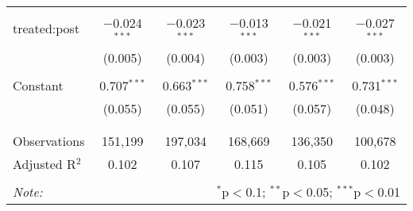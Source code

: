 \begin{table}[!htbp]
\begin{tabular}{@{\extracolsep{0pt}}lccccc}
  & & & & & \\ 
 treated:post & $-$0.024$^{***}$ & $-$0.023$^{***}$ & $-$0.013$^{***}$ & $-$0.021$^{***}$ & $-$0.027$^{***}$ \\ 
  & (0.005) & (0.004) & (0.003) & (0.003) & (0.003) \\ 
  & & & & & \\ 
 Constant & 0.707$^{***}$ & 0.663$^{***}$ & 0.758$^{***}$ & 0.576$^{***}$ & 0.731$^{***}$ \\ 
  & (0.055) & (0.055) & (0.051) & (0.057) & (0.048) \\ 
  & & & & & \\ 
\hline \\[-1.8ex] 
Observations & 151,199 & 197,034 & 168,669 & 136,350 & 100,678 \\ 
Adjusted R$^{2}$ & 0.102 & 0.107 & 0.115 & 0.105 & 0.102 \\ 
\hline 
\hline \\[-1.8ex] 
\textit{Note:}  & \multicolumn{5}{r}{$^{*}$p$<$0.1; $^{**}$p$<$0.05; $^{***}$p$<$0.01} \\ 
\end{tabular} 
\end{table} 
